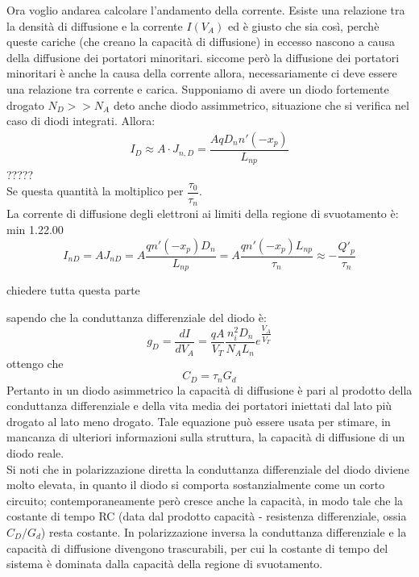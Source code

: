 Ora voglio andarea calcolare l'andamento della corrente.
Esiste una relazione tra la densità di diffusione e la corrente $I(V_A)$ ed è giusto che sia così, perchè queste cariche (che creano la capacità di diffusione) in eccesso nascono a causa della diffusione dei portatori minoritari. siccome però la diffusione dei portatori minoritari è anche la causa della corrente allora, necessariamente ci deve essere una relazione tra corrente e carica.
Supponiamo di avere un diodo fortemente drogato $N_D >> N_A$ deto anche diodo assimmetrico, situazione che si verifica nel caso di diodi integrati. Allora:
\begin{align}
    I_D \approx A \cdot J_{n,D}= \dfrac{AqD_nn'(-x_p)}{L_{np}}
\end{align}
?????\\
Se questa quantità la moltiplico per $\dfrac{\tau_0}{\tau_n}$.\\
La corrente di diffusione degli elettroni ai limiti della regione di svuotamento è:
min 1.22.00\\
\begin{equation}
    I_{nD}=AJ_{nD} =A\dfrac{qn'(-x_p)D_n}{L_{np}}=A\dfrac{qn'(-x_p)L_{np}}{\tau_n} \approx - \dfrac{Q'_p}{\tau_n}
\end{equation}
\begin{ricevimento}
    chiedere tutta questa parte
\end{ricevimento}
sapendo che la conduttanza differenziale del diodo è:
\begin{equation}
    g_D=\dfrac{dI}{dV_A}=\dfrac{qA}{V_T}\dfrac{n_i^2 D_n}{N_A L_n}e^{\dfrac{V_A}{V_T}}
\end{equation}
ottengo che
\begin{equation}
    C_D=\tau_nG_d
\end{equation}
Pertanto in un diodo asimmetrico la capacità di diffusione è pari al prodotto della conduttanza differenziale e della vita media dei portatori iniettati dal lato più drogato al lato meno drogato. Tale equazione può essere usata per stimare, in mancanza di ulteriori informazioni sulla struttura, la capacità di diffusione di un diodo reale.\\
Si noti che in polarizzazione diretta la conduttanza differenziale del diodo diviene molto elevata, in quanto il diodo si comporta sostanzialmente come un corto circuito; contemporaneamente però cresce anche la capacità, in modo tale che la costante di tempo RC (data dal prodotto capacità - resistenza differenziale, ossia
$C_D/G_d$) resta costante. In polarizzazione inversa la conduttanza differenziale e la capacità di diffusione divengono trascurabili, per cui la costante di tempo del sistema è dominata dalla capacità della regione di svuotamento.

